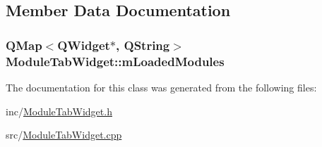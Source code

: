 \subsection{Member Data Documentation}
\hypertarget{class_module_tab_widget_a62d4ca41f48e88b26099ca524e696557}{
\subsubsection[{m\+Loaded\+Modules}]{\setlength{\rightskip}{0pt plus 5cm}Q\+Map$<$Q\+Widget$\ast$, Q\+String$>$ Module\+Tab\+Widget\+::m\+Loaded\+Modules\hspace{0.3cm}{\ttfamily [private]}}}\label{class_module_tab_widget_a62d4ca41f48e88b26099ca524e696557}


The documentation for this class was generated from the following files\+:\begin{DoxyCompactItemize}
\item 
inc/\hyperlink{_module_tab_widget_8h}{Module\+Tab\+Widget.\+h}\item 
src/\hyperlink{_module_tab_widget_8cpp}{Module\+Tab\+Widget.\+cpp}\end{DoxyCompactItemize}
